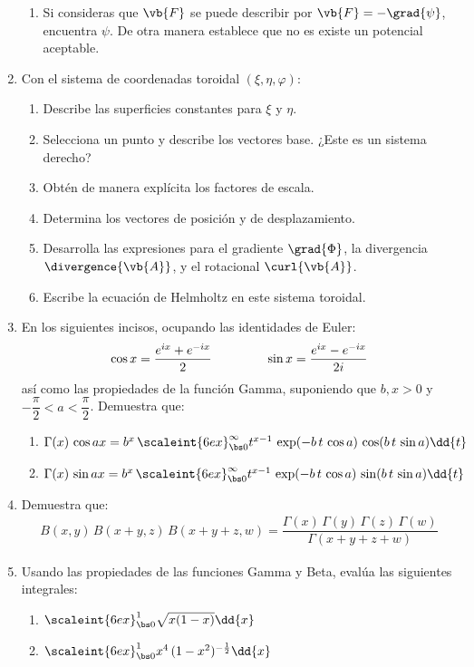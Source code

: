 \begin{enumerate}
\begin{enumerate}[label=\roman*)]
\item Si consideras que $\vb{F}$ se puede describir por $\vb{F} = - \grad{\psi}$, encuentra $\psi$. De otra manera establece que no es existe un potencial aceptable.
\end{enumerate}
\item Con el sistema de coordenadas toroidal $(\xi, \eta, \varphi)$:
\begin{enumerate}[label=\alph*)]
\item Describe las superficies constantes para $\xi$ y $\eta$.
\item Selecciona un punto y describe los vectores base. ¿Este es un sistema derecho?
\item Obtén de manera explícita los factores de escala.
\item Determina los vectores de posición y de desplazamiento.
\item Desarrolla las expresiones para el gradiente $\grad{\Phi}$, la divergencia \hfill \break $\divergence{\vb{A}}$, y el rotacional $\curl{\vb{A}}$.
\item Escribe la ecuación de Helmholtz en este sistema toroidal.
\end{enumerate}
\item En los siguientes incisos, ocupando las identidades de Euler:
\begin{align*}
\cos x = \dfrac{e^{i x} + e^{-i x}}{2} \hspace{1.5cm} \sin x = \dfrac{e^{i x} - e^{-i x}}{2 i}
\end{align*}
así como las propiedades de la función Gamma, suponiendo que $b, x > 0$ y $-\dfrac{\pi}{2} < a < \dfrac{\pi}{2}$. Demuestra que:
\begin{enumerate}[label=\alph*)]
\item $\Gamma (x) \, \cos a x = b^{x} \, \scaleint{6ex}_{\bs 0}^{\infty} t^{x-1} \, \exp(- b \, t \, \cos a) \, \cos (b \, t \, \sin a) \dd{t}$
\item $\Gamma (x) \, \sin a x = b^{x} \, \scaleint{6ex}_{\bs 0}^{\infty} t^{x-1} \, \exp(- b \, t \, \cos a) \, \sin (b \, t \, \sin a) \dd{t}$
\end{enumerate}
\item Demuestra que:
\begin{align*}
B(x, y) \, B(x + y, z) \, B(x + y + z, w) = \dfrac{\Gamma(x) \, \Gamma (y) \, \Gamma (z) \, \Gamma (w)}{\Gamma (x + y + z + w)}
\end{align*}
\item Usando las propiedades de las funciones Gamma y Beta, evalúa las siguientes integrales:
\begin{enumerate}[label=\alph*)]
\item $\scaleint{6ex}_{\bs 0}^{1} \sqrt{x (1 - x)} \dd{x}$
\item $\scaleint{6ex}_{\bs 0}^{1} x^{4} \, (1 - x^{2})^{-\frac{1}{2}} \dd{x}$
\end{enumerate}
\end{enumerate}

